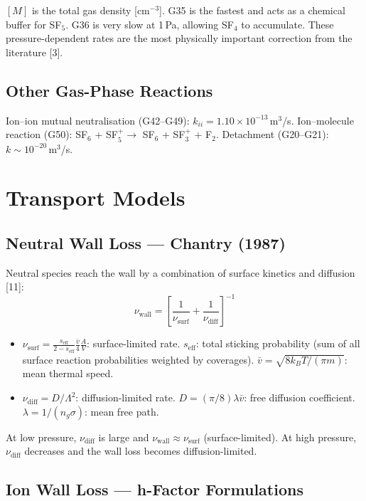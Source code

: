 \documentclass[11pt,a4paper]{article}
\begin{document}
$[M]$ is the total gas density [cm$^{-3}$]. G35 is the fastest and acts as a chemical buffer for SF$_5$. G36 is very slow at 1\,Pa, allowing SF$_4$ to accumulate. These pressure-dependent rates are the most physically important correction from the literature [3].

\subsection{Other Gas-Phase Reactions}

Ion--ion mutual neutralisation (G42--G49): $k_{ii} = 1.10\times10^{-13}$\,m$^3$/s. Ion--molecule reaction (G50): SF$_6$ + SF$_5^+ \to$ SF$_6$ + SF$_3^+$ + F$_2$. Detachment (G20--G21): $k \sim 10^{-20}$\,m$^3$/s.

\section{Transport Models}

\subsection{Neutral Wall Loss --- Chantry (1987)}

Neutral species reach the wall by a combination of surface kinetics and diffusion [11]:
\begin{equation}\label{eq:chantry}
\boxed{\nu_\text{wall} = \left[\frac{1}{\nu_\text{surf}} + \frac{1}{\nu_\text{diff}}\right]^{-1}}
\end{equation}
\begin{itemize}[nosep]
\item $\nu_\text{surf} = \frac{s_\text{eff}}{2-s_\text{eff}}\frac{\bar{v}}{4}\frac{A}{V}$: surface-limited rate. $s_\text{eff}$: total sticking probability (sum of all surface reaction probabilities weighted by coverages). $\bar{v} = \sqrt{8k_BT/({\pi}m)}$: mean thermal speed.
\item $\nu_\text{diff} = D/\Lambda^2$: diffusion-limited rate. $D = (\pi/8)\lambda\bar{v}$: free diffusion coefficient. $\lambda = 1/(n_g\sigma)$: mean free path.
\end{itemize}

At low pressure, $\nu_\text{diff}$ is large and $\nu_\text{wall} \approx \nu_\text{surf}$ (surface-limited). At high pressure, $\nu_\text{diff}$ decreases and the wall loss becomes diffusion-limited.

\subsection{Ion Wall Loss --- h-Factor Formulations}
\end{document}

